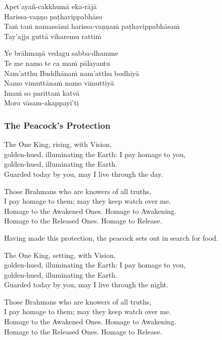 
\vspace*{-.2\baselineskip}

Apet'ayañ-cakkhumā eka-rājā\\
Harissa-vaṇṇo paṭhavippabhāso\\
Taṁ taṁ namassāmi harissa-vaṇṇaṁ paṭhavippabhāsaṁ\\
Tay'ajja guttā viharemu rattiṁ

Ye brāhmaṇā vedagu sabba-dhamme\\
Te me namo te ca maṁ pālayantu\\
Nam'atthu Buddhānaṁ nam'atthu bodhiyā\\
Namo vimuttānaṁ namo vimuttiyā\\
Imaṁ so parittaṁ katvā\\
Moro vāsam-akappayī'ti 

\subsubsection{The Peacock's Protection}

The One King, rising, with Vision,\\
golden-hued, illuminating the Earth: I pay homage to you,\\
golden-hued, illuminating the Earth.\\
Guarded today by you, may I live through the day.

Those Brahmans who are knowers of all truths,\\
I pay homage to them; may they keep watch over me.\\
Homage to the Awakened Ones. Homage to Awakening.\\
Homage to the Released Ones. Homage to Release.

Having made this protection, the peacock sets out in search for food.

The One King, setting, with Vision,\\
golden-hued, illuminating the Earth: I pay homage to you,\\
golden-hued, illuminating the Earth.\\
Guarded today by you, may I live through the night.

Those Brahmans who are knowers of all truths,\\
I pay homage to them; may they keep watch over me.\\
Homage to the Awakened Ones. Homage to Awakening.\\
Homage to the Released Ones. Homage to Release.


